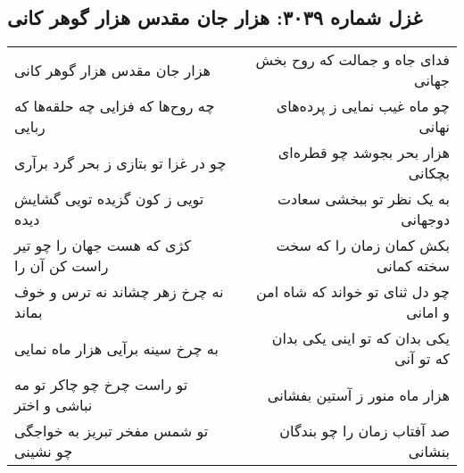 \begin{center}
\section*{غزل شماره ۳۰۳۹: هزار جان مقدس هزار گوهر کانی}
\label{sec:3039}
\begin{longtable}{l p{0.5cm} r}
هزار جان مقدس هزار گوهر کانی
&&
فدای جاه و جمالت که روح بخش جهانی
\\
چه روح‌ها که فزایی چه حلقه‌ها که ربایی
&&
چو ماه غیب نمایی ز پرده‌های نهانی
\\
چو در غزا تو بتازی ز بحر گرد برآری
&&
هزار بحر بجوشد چو قطره‌ای بچکانی
\\
تویی ز کون گزیده تویی گشایش دیده
&&
به یک نظر تو ببخشی سعادت دوجهانی
\\
کژی که هست جهان را چو تیر راست کن آن را
&&
بکش کمان زمان را که سخت سخته کمانی
\\
نه چرخ زهر چشاند نه ترس و خوف بماند
&&
چو دل ثنای تو خواند که شاه امن و امانی
\\
به چرخ سینه برآیی هزار ماه نمایی
&&
یکی بدان که تو اینی یکی بدان که تو آنی
\\
تو راست چرخ چو چاکر تو مه نباشی و اختر
&&
هزار ماه منور ز آستین بفشانی
\\
تو شمس مفخر تبریز به خواجگی چو نشینی
&&
صد آفتاب زمان را چو بندگان بنشانی
\\
\end{longtable}
\end{center}
